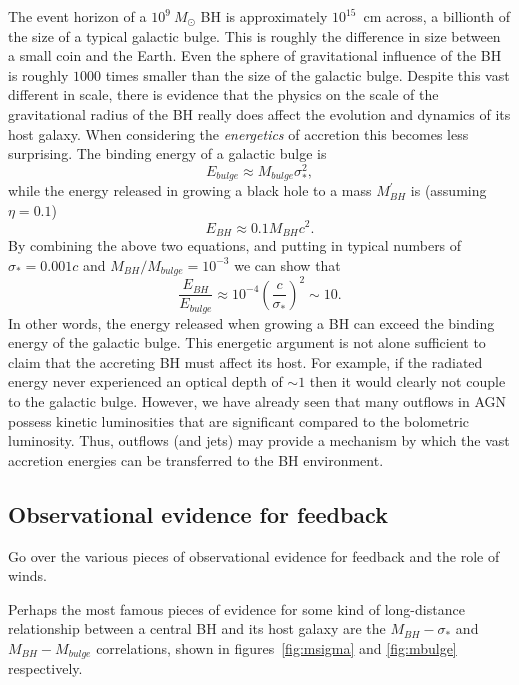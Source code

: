The event horizon of a $10^9~M_\odot$ BH is approximately 
$10^{15}$~cm across, a billionth of the size of a typical galactic bulge. This is 
roughly the difference in size between a small coin and the 
Earth. Even the sphere of gravitational influence of the BH is roughly 
$1000$ times smaller than the size of the galactic bulge.
Despite this vast different in scale, there is evidence
that the physics on the scale of the gravitational
radius of the BH really does affect the evolution and dynamics of its host galaxy.
When considering the {\em energetics} of accretion this becomes less surprising.
The binding energy of a galactic bulge is 
\begin{equation}
E_{bulge} \approx M_{bulge} \sigma_*^2,
\end{equation}
while the energy released in growing a black hole to a 
mass $M_{BH}^\prime$ is (assuming $\eta=0.1$)
\begin{equation}
E_{BH} \approx 0.1 M_{BH} c^2.  
\end{equation}
By combining the above two equations, and putting in typical numbers of
$\sigma_* = 0.001c$ and $M_{BH} / M_{bulge} = 10^{-3}$ we can show that 
\begin{equation}
\frac{E_{BH}}{E_{bulge}} \approx 10^{-4} \left( \frac{c}{\sigma_*} \right)^2 \sim 10.
\end{equation}
In other words, the energy released when growing a BH can exceed
the binding energy of the galactic bulge. This energetic 
argument is not alone sufficient to claim that the accreting BH must affect its
host. For example, if the radiated energy never experienced an 
optical depth of $\sim 1$ then it would clearly not couple to the galactic bulge. However,
we have already seen that many outflows in AGN possess kinetic luminosities that
are significant compared to the bolometric luminosity. Thus, outflows 
(and jets) may provide a mechanism by which the vast accretion energies can
be transferred to the BH environment.

\subsection{Observational evidence for feedback}

{
\color{blue}
Go over the various pieces of observational evidence for feedback
and the role of winds.
}
\bigskip

Perhaps the most famous pieces of evidence for some kind of long-distance 
relationship between a central BH and its host galaxy are the 
$M_{BH}-\sigma_*$ and $M_{BH}-M_{bulge}$ correlations, shown in figures~\ref{fig:msigma}
and \ref{fig:mbulge} respectively.

